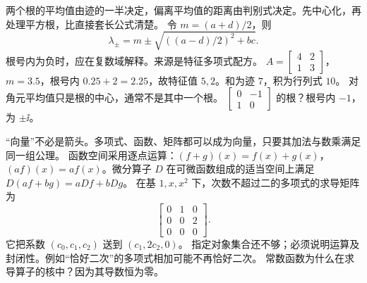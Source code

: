 \idea 两个根的平均值由迹的一半决定，偏离平均值的距离由判别式决定。先中心化，再处理平方根，比直接套长公式清楚。
\mathpart 令 $m=(a+d)/2$，则
\[\lambda_{\pm}=m\pm\sqrt{((a-d)/2)^2+bc}.\]
根号内为负时，应在复数域解释。来源是特征多项式配方。
\examplepart $A=\left[\begin{smallmatrix}4&2\\1&3\end{smallmatrix}\right]$，$m=3.5$，根号内 $0.25+2=2.25$，故特征值 $5,2$。和为迹 $7$，积为行列式 $10$。
\pitfall 对角元平均值只是根的中心，通常不是其中一个根。
\exercise $\left[\begin{smallmatrix}0&-1\\1&0\end{smallmatrix}\right]$ 的根？根号内 $-1$，为 $\pm\ii$。
\nextlesson

\idea “向量”不必是箭头。多项式、函数、矩阵都可以成为向量，只要其加法与数乘满足同一组公理。
\mathpart 函数空间采用逐点运算：$(f+g)(x)=f(x)+g(x)$，$(af)(x)=af(x)$。微分算子 $D$ 在可微函数组成的适当空间上满足 $D(af+bg)=aDf+bDg$。
\examplepart 在基 $1,x,x^2$ 下，次数不超过二的多项式的求导矩阵为
\[\begin{bmatrix}0&1&0\\0&0&2\\0&0&0\end{bmatrix}.\]
它把系数 $(c_0,c_1,c_2)$ 送到 $(c_1,2c_2,0)$。
\pitfall 指定对象集合还不够；必须说明运算及封闭性。例如“恰好二次”的多项式相加可能不再恰好二次。
\exercise 常数函数为什么在求导算子的核中？因为其导数恒为零。
